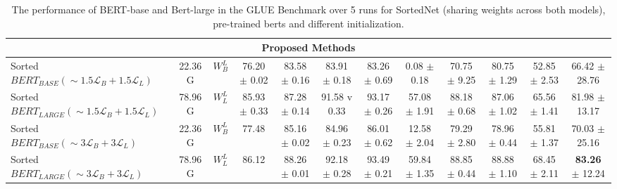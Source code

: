 \documentclass[letterpaper]{article} %
\begin{document}
\begin{table*}[h!]
{\begin{tabular}{lccccccccccc}
\hline
\multicolumn{12}{c}{Proposed Methods} \\
\hline
Sorted $BERT_{BASE} (\sim1.5\mathcal{L}_B+1.5\mathcal{L}_L)$ & 22.36 G & $W_B^L$ & 76.20 $\pm$ 0.02 & 83.58 $\pm$ 0.16 & 83.91 $\pm$ 0.18 & 83.26 $\pm$ 0.69 & 0.08 $\pm$ 0.18 & 70.75 $\pm$ 9.25 & 80.75 $\pm$ 1.29 & 52.85 $\pm$ 2.53 & 66.42 $\pm$ 28.76 \\
Sorted $BERT_{LARGE} (\sim1.5\mathcal{L}_B+1.5\mathcal{L}_L)$ & 78.96 G & $W_L^L$ & 85.93 $\pm$ 0.33 & 87.28 $\pm$ 0.14 & 91.58 v 0.33 & 93.17 $\pm$ 0.26 & 57.08 $\pm$ 1.91 & 88.18 $\pm$ 0.68 & 87.06 $\pm$ 1.02 & 65.56 $\pm$ 1.41 & 81.98 $\pm$ 13.17 \\
Sorted $BERT_{BASE} (\sim3\mathcal{L}_B+3\mathcal{L}_L)$ & 22.36 G & $W_B^L$ & 77.48 & 85.16 $\pm$ 0.02 & 84.96 $\pm$ 0.23 & 86.01 $\pm$ 0.62 & 12.58 $\pm$ 2.04 & 79.29 $\pm$ 2.80 & 78.96 $\pm$ 0.44 & 55.81 $\pm$ 1.37 & 70.03 $\pm$ 25.16 \\
Sorted $BERT_{LARGE} (\sim3\mathcal{L}_B+3\mathcal{L}_L)$ & 78.96 G & $W_L^L$ & 86.12 & 88.26 $\pm$ 0.01 & 92.18 $\pm$ 0.28 & 93.49 $\pm$ 0.21 & 59.84 $\pm$ 1.35 & 88.85 $\pm$ 0.44 & 88.88 $\pm$ 1.10 & 68.45 $\pm$ 2.11 & \textbf{83.26} $\pm$ 12.24 \\
\hline
\end{tabular}}
\caption{The performance of BERT-base and Bert-large in the GLUE Benchmark over 5 runs for SortedNet (sharing weights across both models), pre-trained berts and different initialization.}
\label{tab:bert_base_large_ft}
\end{table*}
\end{document}
